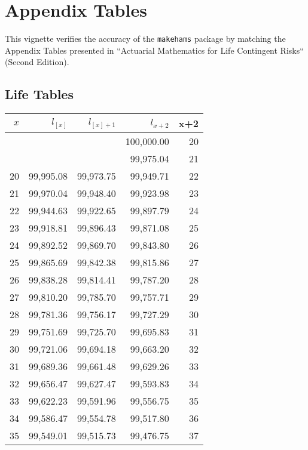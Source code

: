 \documentclass[12pt]{article}
\begin{document}


\section{Appendix Tables}

This vignette verifies the accuracy of the \texttt{makehams} package by matching the Appendix Tables presented in ``Actuarial Mathematics for Life Contingent Risks`` (Second Edition).


\subsection{Life Tables}

\begin{longtable}{rrrrr}
  \hline
$x$ & $l_{[x]}$ & $l_{[x]+1}$ & $l_{x+2}$ & x+2 \\ 
  \hline \endhead  &  &  & 100,000.00 &  20 \\ 
   &  &  & 99,975.04 &  21 \\ 
   20 & 99,995.08 & 99,973.75 & 99,949.71 &  22 \\ 
   21 & 99,970.04 & 99,948.40 & 99,923.98 &  23 \\ 
   22 & 99,944.63 & 99,922.65 & 99,897.79 &  24 \\ 
   23 & 99,918.81 & 99,896.43 & 99,871.08 &  25 \\ 
   24 & 99,892.52 & 99,869.70 & 99,843.80 &  26 \\ 
   25 & 99,865.69 & 99,842.38 & 99,815.86 &  27 \\ 
   26 & 99,838.28 & 99,814.41 & 99,787.20 &  28 \\ 
   27 & 99,810.20 & 99,785.70 & 99,757.71 &  29 \\ 
   28 & 99,781.36 & 99,756.17 & 99,727.29 &  30 \\ 
   29 & 99,751.69 & 99,725.70 & 99,695.83 &  31 \\ 
   30 & 99,721.06 & 99,694.18 & 99,663.20 &  32 \\ 
   31 & 99,689.36 & 99,661.48 & 99,629.26 &  33 \\ 
   32 & 99,656.47 & 99,627.47 & 99,593.83 &  34 \\ 
   33 & 99,622.23 & 99,591.96 & 99,556.75 &  35 \\ 
   34 & 99,586.47 & 99,554.78 & 99,517.80 &  36 \\ 
   35 & 99,549.01 & 99,515.73 & 99,476.75 &  37 \\ 

\end{longtable}
\end{document}
